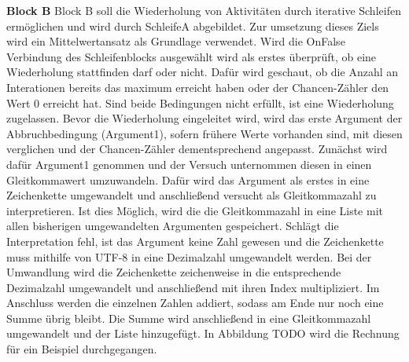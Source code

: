     \textbf{Block B}
    Block B soll die Wiederholung von Aktivitäten durch iterative Schleifen ermöglichen und wird durch SchleifeA abgebildet.
    Zur umsetzung dieses Ziels wird ein Mittelwertansatz als Grundlage verwendet.
    Wird die OnFalse Verbindung des Schleifenblocks ausgewählt wird als erstes überprüft, ob eine Wiederholung stattfinden darf oder nicht.
    Dafür wird geschaut, ob die Anzahl an Interationen bereits das maximum erreicht haben oder der Chancen-Zähler den Wert 0 erreicht hat.
    Sind beide Bedingungen nicht erfüllt, ist eine Wiederholung zugelassen.
    Bevor die Wiederholung eingeleitet wird, wird das erste Argument der Abbruchbedingung (Argument1), sofern frühere Werte vorhanden sind, mit diesen verglichen und der Chancen-Zähler dementsprechend angepasst.
    Zunächst wird dafür Argument1 genommen und der Versuch unternommen diesen in einen Gleitkommawert umzuwandeln. 
    Dafür wird das Argument als erstes in eine Zeichenkette umgewandelt und anschließend versucht als Gleitkommazahl zu interpretieren.
    Ist dies Möglich, wird die die Gleitkommazahl in eine Liste mit allen bisherigen umgewandelten Argumenten gespeichert.
    Schlägt die Interpretation fehl, ist das Argument keine Zahl gewesen und die Zeichenkette muss mithilfe von UTF-8 in eine Dezimalzahl umgewandelt werden.
    Bei der Umwandlung wird die Zeichenkette zeichenweise in die entsprechende Dezimalzahl umgewandelt und anschließend mit ihren Index multipliziert.
    Im Anschluss werden die einzelnen Zahlen addiert, sodass am Ende nur noch eine Summe übrig bleibt.
    Die Summe wird anschließend in eine Gleitkommazahl umgewandelt und der Liste hinzugefügt.
    In Abbildung TODO wird die Rechnung für ein Beispiel durchgegangen.\\
    \\

